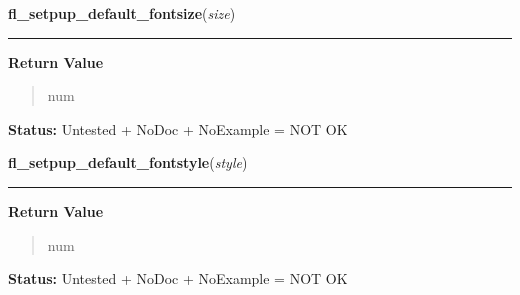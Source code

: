 \hspace{.8\funcindent}\begin{boxedminipage}{\funcwidth}

    \raggedright \textbf{fl\_setpup\_default\_fontsize}(\textit{size})

    \vspace{-1.5ex}

    \rule{\textwidth}{0.5\fboxrule}
\setlength{\parskip}{2ex}
\setlength{\parskip}{1ex}
      \textbf{Return Value}
    \vspace{-1ex}

      \begin{quote}
      num

      \end{quote}

\textbf{Status:} Untested + NoDoc + NoExample = NOT OK



    \end{boxedminipage}

    \label{xformslib:library:fl_setpup_default_fontstyle}

    \vspace{0.5ex}

\hspace{.8\funcindent}\begin{boxedminipage}{\funcwidth}

    \raggedright \textbf{fl\_setpup\_default\_fontstyle}(\textit{style})

    \vspace{-1.5ex}

    \rule{\textwidth}{0.5\fboxrule}
\setlength{\parskip}{2ex}
\setlength{\parskip}{1ex}
      \textbf{Return Value}
    \vspace{-1ex}

      \begin{quote}
      num

      \end{quote}

\textbf{Status:} Untested + NoDoc + NoExample = NOT OK



    \end{boxedminipage}

    \label{xformslib:library:fl_setpup_default_fontsize}


